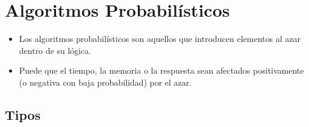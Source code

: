 \documentclass{templateNote}
\begin{document}
\newpage

\section{Algoritmos Probabilísticos}
\begin{itemize}
    \item Los algoritmos probabilísticos son aquellos que introducen elementos al azar dentro de su lógica.
    \item Puede que el tiempo, la memoria o la respuesta sean afectados positivamente (o negativa con baja probabilidad) por el azar.
\end{itemize}

\subsection*{Tipos}
\end{document}
